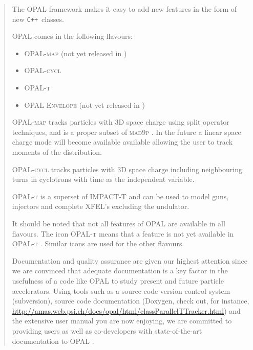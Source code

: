 \documentclass[12pt,a4paper]{report}
\newcommand{\opalversion}{\text{1.1.5 }}
\newcommand{\madninep}{\textsc{mad9p }}
\newcommand{\opal}{\textsc{OPAL }}
\newcommand{\opalt}{\textsc{OPAL-t }}
\newcommand{\opalcycl}{\textsc{OPAL-cycl }}
\newcommand{\opalmap}{\textsc{OPAL-map }}
\newcommand{\opalenv}{\textsc{OPAL-Envelope }}
\newcommand{\noopalt}{\leftthumbsdown \opalt }
\begin{document}
\begin{titlepage}
\begin{quotation}
The \opal framework makes it easy to add new features in the form of new
\texttt{C++}~classes.

OPAL comes in the following flavours:
\begin{itemize}
\item \opalmap (not yet released in \opalversion)
\item \opalcycl 
\item \opalt
\item \opalenv (not yet released in \opalversion)
\end{itemize}

\opalmap tracks particles with 3D space charge using split operator techniques, and is a proper subset of \madninep. In the future 
a linear space charge mode will become available available
allowing the user to track moments of the distribution. 

\opalcycl tracks particles with 3D space charge including neighbouring turns in cyclotrons
with time as the independent variable. 

\opalt is a superset of IMPACT-T \cite{qiang2005} and can be used to model guns, injectors and complete XFEL's excluding the undulator.

It should be noted that not all features of \opal are available in all flavours. The icon \noopalt means that a feature is not yet 
available in \opalt. Similar icons are used for the other flavours. 

Documentation and quality assurance are given our highest attention since we are convinced that adequate documentation 
is a key factor in the usefulness of a code like \opal to study present and future particle accelerators. 
 Using tools such as a source code version
control system (subversion), source code documentation (Doxygen, check out, for instance,  \url{http://amas.web.psi.ch/docs/opal/html/classParallelTTracker.html}) and the extensive user manual
you are now enjoying, we are committed to providing users as well as co-developers with 
state-of-the-art documentation to \opal.

\end{quotation}
\vfill
\end{titlepage}

\tableofcontents
\listoftables
\listoffigures



 












%


\appendix




\printindex
\end{document}

